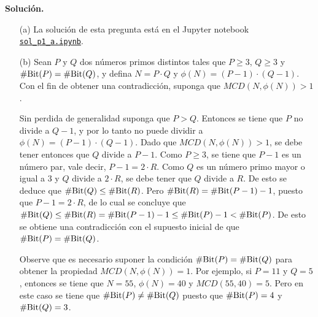 \documentclass[11pt]{article}
\newcommand{\MCD}{\textit{MCD}}
\begin{document}
\noindent
{\bf Solución.}
\begin{enumerate}
\item[(a)] La solución de esta pregunta está en el Jupyter notebook
  \href{https://github.com/IIC3253/2023/blob/main/tareas/tarea\%202/enunciado/questions/p1/pregunta1_a.ipynb}{\texttt{sol\_p1\_a.ipynb}}.


\item[(b)] Sean $P$ y $Q$ dos números primos distintos tales que $P
  \geq 3$, $Q \geq 3$ y $\#\text{Bit}(P) = \#\text{Bit}(Q)$, y defina $N = P \cdot Q$
  y $\phi(N) = (P-1) \cdot (Q-1)$. Con el fin de obtener una
  contradicción, suponga que $\MCD(N, \phi(N)) > 1$.

  Sin perdida de generalidad suponga que $P > Q$. Entonces se tiene
  que $P$ no divide a $Q-1$, y por lo tanto no puede dividir a
  $\phi(N) = (P-1) \cdot (Q-1)$. Dado que $\MCD(N, \phi(N)) > 1$, se
  debe tener entonces que $Q$ divide a $P-1$. Como $P \geq 3$, se
  tiene que $P-1$ es un número par, vale decir, $P-1 = 2 \cdot
  R$. Como $Q$ es un número primo mayor o igual a $3$ y $Q$ divide a
  $2 \cdot R$, se debe tener que $Q$ divide a $R$. De esto se deduce
  que $\#\text{Bit}(Q) \leq \#\text{Bit}(R)$. Pero $\#\text{Bit}(R) = \#\text{Bit}(P-1) - 1$,
  puesto que $P-1 = 2 \cdot R$, de lo cual se concluye que $\#\text{Bit}(Q)
  \leq \#\text{Bit}(R) = \#\text{Bit}(P-1) - 1 \leq \#\text{Bit}(P) - 1 < \#\text{Bit}(P)$. De
  esto se obtiene una contradicción con el supuesto inicial de que
  $\#\text{Bit}(P) = \#\text{Bit}(Q)$.

  Observe que es necesario suponer la condición $\#\text{Bit}(P) = \#\text{Bit}(Q)$ para
  obtener la propiedad $\MCD(N, \phi(N)) = 1$. Por ejemplo, si $P = 11$ y $Q =
  5$, entonces se tiene que $N = 55$, $\phi(N) = 40$ y $\MCD(55, 40) =
  5$. Pero en este caso se tiene que $\#\text{Bit}(P) \neq \#\text{Bit}(Q)$ puesto que
  $\#\text{Bit}(P) = 4$ y $\#\text{Bit}(Q) = 3$.


\end{enumerate}
\end{document}
